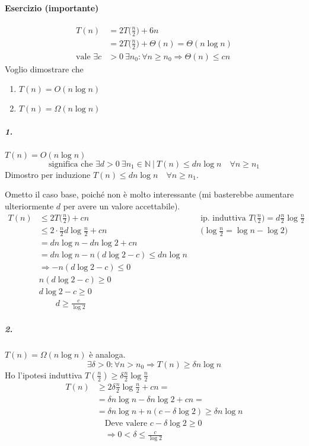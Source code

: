 \paragraph{Esercizio (importante)} 
\begin{align*}
	T(n) & = 2T\Big(\frac{n}{2}\Big) + 6n \\
		& = 2T\Big(\frac{n}{2}\Big) + \Theta (n) = \Theta (n \log n) \\
		\text{vale } \exists c & > 0 \ \exists n_0 : \forall n \geq n_0 \Rightarrow \Theta(n) \leq cn
\end{align*}
Voglio dimostrare che 
\begin{enumerate}
	\item $T(n) = O(n \log n)$
	\item $T(n) = \Omega (n \log n)$
\end{enumerate}

\subparagraph{1.} $T(n) = O(n \log n)$
\begin{displaymath}
	\text{significa che } \exists d > 0 \ \exists n_1 \in \mathbb{N} \ \vert \ T(n) \leq dn \log n \quad \forall n \geq n_1
\end{displaymath}
Dimostro per induzione $T(n) \leq dn \log n \quad \forall n \geq n_1$.\par
Ometto il caso base, poiché non è molto interessante (mi basterebbe aumentare ulteriormente $d$ per avere
un valore accettabile).
\begin{align*}
	T(n) & \leq 2T\Big(\frac{n}{2}\Big) + cn && \text{ip. induttiva } T\Big(\frac{n}{2}\Big) = d \frac{n}{2} \log \frac{n}{2} \\
	& \leq 2 \cdot \frac{n}{2} d \log \frac{n}{2} + cn && \Big(\log \frac{n}{2} = \log n - \log 2\Big) \\
	& = dn \log n - dn \log 2 + cn \\
	& = dn \log n - n(d \log 2 - c) \leq dn \log n \\
	& \Rightarrow - n(d \log 2 - c) \leq 0 \\
	& n(d \log 2 - c) \geq 0 \\
	& d \log 2 - c \geq 0 \\
	& \qquad d \geq \frac{c}{\log 2}
\end{align*}

\subparagraph{2.} $T(n) = \Omega (n \log n)$ è analoga.
\[
	\exists \delta > 0 : \forall n > n_0 \Rightarrow T(n) \geq \delta n \log n
\]
Ho l'ipotesi induttiva $T(\frac{n}{2}) \geq \delta \frac{n}{2} \log \frac{n}{2}$
\begin{align*}
	T(n) & \geq 2\delta \frac{n}{2} \log \frac{n}{2} + cn = \\
	& = \delta n \log n - \delta n \log 2 + cn = \\
	& = \delta n \log n + n(c - \delta \log 2) \geq \delta n \log n \\
	& \quad \text{Deve valere } c - \delta \log 2 \geq 0 \\
	& \quad \Rightarrow 0 < \delta \leq \frac{c}{\log 2}
\end{align*}
